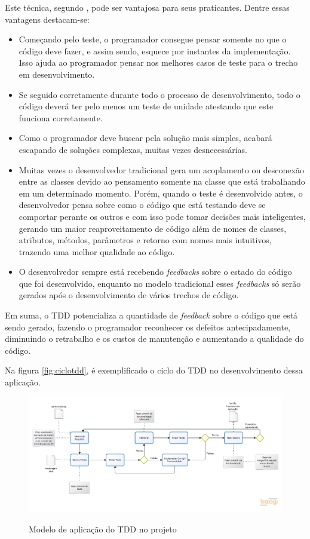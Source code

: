 Este técnica, segundo , pode ser vantajosa para seus praticantes. Dentre essas vantagens destacam-se:

\begin{itemize}
    \item Começando pelo teste, o programador consegue pensar somente no que o código deve fazer, e assim sendo, esquece por instantes da implementação. Isso ajuda ao programador pensar nos melhores casos de teste para o trecho em desenvolvimento.
    \item Se seguido corretamente durante todo o processo de desenvolvimento, todo o código deverá ter pelo menos um teste de unidade atestando que este funciona corretamente.
    \item Como o programador deve buscar pela solução mais simples, acabará escapando de soluções complexas, muitas vezes desnecessárias.
    \item Muitas vezes o desenvolvedor tradicional gera um acoplamento ou desconexão entre as classes devido ao pensamento somente na classe que está trabalhando em um determinado momento. Porém, quando o teste é desenvolvido antes, o desenvolvedor pensa sobre como o código que está testando deve se comportar perante os outros e com isso pode tomar decisões mais inteligentes, gerando um maior reaproveitamento de código além de nomes de classes, atributos, métodos, parâmetros e retorno com nomes mais intuitivos, trazendo uma melhor qualidade ao código. 
    \item O desenvolvedor sempre está recebendo \textit{feedbacks} sobre o estado do código que foi desenvolvido, enquanto no modelo tradicional esses \textit{feedbacks} só serão gerados após o desenvolvimento de vários trechos de código.
\end{itemize}

Em suma, o TDD potencializa a quantidade de \textit{feedback} sobre o código que está sendo gerado, fazendo o programador reconhecer os defeitos antecipadamente, diminuindo o retrabalho e os custos de manutenção e aumentando a qualidade do código. 

Na figura \autoref{fig:ciclotdd}, é exemplificado o ciclo do TDD no desenvolvimento dessa aplicação.

\begin{figure}[H]
    \centering
    \caption{Modelo de aplicação do TDD no projeto}
    \includegraphics[width=13cm]{dados/figuras/ModeloDeAplicacaoTDD.png}
    \label{fig:ciclotdd}
\end{figure}

